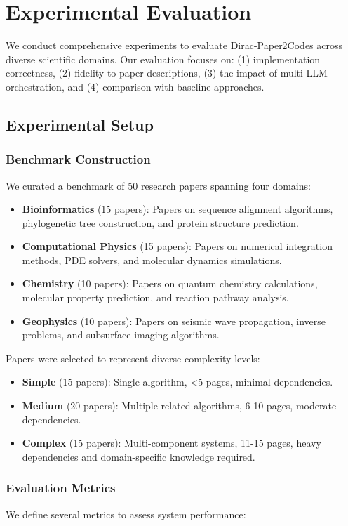 \documentclass{ieeeaccess}
\begin{document}
\section{Experimental Evaluation}\label{sec:experiments}
We conduct comprehensive experiments to evaluate Dirac-Paper2Codes across diverse scientific domains. Our evaluation focuses on: (1) implementation correctness, (2) fidelity to paper descriptions, (3) the impact of multi-LLM orchestration, and (4) comparison with baseline approaches.

\subsection{Experimental Setup}
\subsubsection{Benchmark Construction}
We curated a benchmark of 50 research papers spanning four domains:
\begin{itemize}
    \item \textbf{Bioinformatics} (15 papers): Papers on sequence alignment algorithms, phylogenetic tree construction, and protein structure prediction.
    \item \textbf{Computational Physics} (15 papers): Papers on numerical integration methods, PDE solvers, and molecular dynamics simulations.
    \item \textbf{Chemistry} (10 papers): Papers on quantum chemistry calculations, molecular property prediction, and reaction pathway analysis.
    \item \textbf{Geophysics} (10 papers): Papers on seismic wave propagation, inverse problems, and subsurface imaging algorithms.
\end{itemize}

Papers were selected to represent diverse complexity levels:
\begin{itemize}
    \item \textbf{Simple} (15 papers): Single algorithm, <5 pages, minimal dependencies.
    \item \textbf{Medium} (20 papers): Multiple related algorithms, 6-10 pages, moderate dependencies.
    \item \textbf{Complex} (15 papers): Multi-component systems, 11-15 pages, heavy dependencies and domain-specific knowledge required.
\end{itemize}

\subsubsection{Evaluation Metrics}
We define several metrics to assess system performance:
\end{document}
